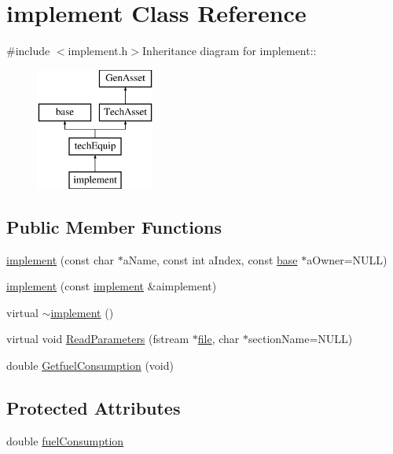 \hypertarget{classimplement}{
\section{implement Class Reference}
\label{classimplement}
}


{\ttfamily \#include $<$implement.h$>$}Inheritance diagram for implement::\begin{figure}[H]
\begin{center}
\leavevmode
\includegraphics[height=4cm]{classimplement}
\end{center}
\end{figure}
\subsection*{Public Member Functions}
\begin{DoxyCompactItemize}
\item 
\hyperlink{classimplement_a307449e3b4f8172c319a431fe26adad1}{implement} (const char $\ast$aName, const int aIndex, const \hyperlink{classbase}{base} $\ast$aOwner=NULL)
\item 
\hyperlink{classimplement_af91a1884048209c13eb92489b5aa8e8d}{implement} (const \hyperlink{classimplement}{implement} \&aimplement)
\item 
virtual \hyperlink{classimplement_aa4cd2a78bef12f10a3f3146594e992c3}{$\sim$implement} ()
\item 
virtual void \hyperlink{classimplement_ab15a9401469890f3bd902bb007009957}{ReadParameters} (fstream $\ast$\hyperlink{classbase_a3af52ee9891719d09b8b19b42450b6f6}{file}, char $\ast$sectionName=NULL)
\item 
double \hyperlink{classimplement_a836a0f02e755905bae9e8eeea7e80a69}{GetfuelConsumption} (void)
\end{DoxyCompactItemize}
\subsection*{Protected Attributes}
\begin{DoxyCompactItemize}
\item 
double \hyperlink{classimplement_a87938ec947a5e6d3ad82dca29577302b}{fuelConsumption}
\end{DoxyCompactItemize}


